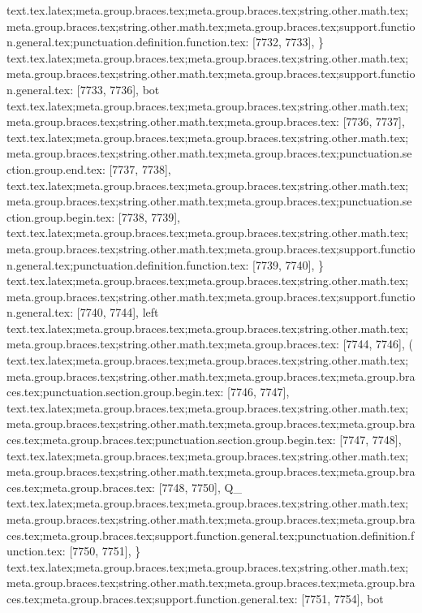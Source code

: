 {{{{{{{{{{{{{{{{{{{{{{{{{{{{{{{{{{{{{{{{{{{{{{{{{{{{{{{{{{{{{{{{{{{{{{{{{{{{{{{{{{{{{{{{{{{{{{{{{{{{{{{{{{{{{{{{{{{{{{{{{{{{{{{{{{{{{{{{{{{{{{{{{{{{{{{{{{{{{{{{{{{{{{{{{{{{{{{{{{{{{{{{{{{{{{{{{{{{{{{{{{{{{{{{{{{{{{{{{{{{{text.tex.latex;meta.group.braces.tex;meta.group.braces.tex;string.other.math.tex;meta.group.braces.tex;string.other.math.tex;meta.group.braces.tex;support.function.general.tex;punctuation.definition.function.tex: [7732, 7733], {\}
text.tex.latex;meta.group.braces.tex;meta.group.braces.tex;string.other.math.tex;meta.group.braces.tex;string.other.math.tex;meta.group.braces.tex;support.function.general.tex: [7733, 7736], {bot}
text.tex.latex;meta.group.braces.tex;meta.group.braces.tex;string.other.math.tex;meta.group.braces.tex;string.other.math.tex;meta.group.braces.tex: [7736, 7737], { }
text.tex.latex;meta.group.braces.tex;meta.group.braces.tex;string.other.math.tex;meta.group.braces.tex;string.other.math.tex;meta.group.braces.tex;punctuation.section.group.end.tex: [7737, 7738], {}}
text.tex.latex;meta.group.braces.tex;meta.group.braces.tex;string.other.math.tex;meta.group.braces.tex;string.other.math.tex;meta.group.braces.tex;punctuation.section.group.begin.tex: [7738, 7739], {{}
text.tex.latex;meta.group.braces.tex;meta.group.braces.tex;string.other.math.tex;meta.group.braces.tex;string.other.math.tex;meta.group.braces.tex;support.function.general.tex;punctuation.definition.function.tex: [7739, 7740], {\}
text.tex.latex;meta.group.braces.tex;meta.group.braces.tex;string.other.math.tex;meta.group.braces.tex;string.other.math.tex;meta.group.braces.tex;support.function.general.tex: [7740, 7744], {left}
text.tex.latex;meta.group.braces.tex;meta.group.braces.tex;string.other.math.tex;meta.group.braces.tex;string.other.math.tex;meta.group.braces.tex: [7744, 7746], {( }
text.tex.latex;meta.group.braces.tex;meta.group.braces.tex;string.other.math.tex;meta.group.braces.tex;string.other.math.tex;meta.group.braces.tex;meta.group.braces.tex;punctuation.section.group.begin.tex: [7746, 7747], {{}
text.tex.latex;meta.group.braces.tex;meta.group.braces.tex;string.other.math.tex;meta.group.braces.tex;string.other.math.tex;meta.group.braces.tex;meta.group.braces.tex;meta.group.braces.tex;punctuation.section.group.begin.tex: [7747, 7748], {{}
text.tex.latex;meta.group.braces.tex;meta.group.braces.tex;string.other.math.tex;meta.group.braces.tex;string.other.math.tex;meta.group.braces.tex;meta.group.braces.tex;meta.group.braces.tex: [7748, 7750], {Q_}
text.tex.latex;meta.group.braces.tex;meta.group.braces.tex;string.other.math.tex;meta.group.braces.tex;string.other.math.tex;meta.group.braces.tex;meta.group.braces.tex;meta.group.braces.tex;support.function.general.tex;punctuation.definition.function.tex: [7750, 7751], {\}
text.tex.latex;meta.group.braces.tex;meta.group.braces.tex;string.other.math.tex;meta.group.braces.tex;string.other.math.tex;meta.group.braces.tex;meta.group.braces.tex;meta.group.braces.tex;support.function.general.tex: [7751, 7754], {bot}
}}}}}}}}}}}}}}}}}}}}}}}}}}}}}}}}}}}}}}}}}}}}}}}}}}}}}}}}}}}}}}}}}}}}}}}}}}}}}}}}}}}}}}}}}}}}}}}}}}}}}}}}}}}}}}}}}}}}}}}}}}}}}}}}}}}}}}}}}}}}}}}}}}}}}}}}}}}}}}}}}}}}}}}}}}}}}}}}}}}}}}}}}}}}}}}}}}}}}}}}}}}}}}}}}}}}}}}}}}}}}}}}}}
